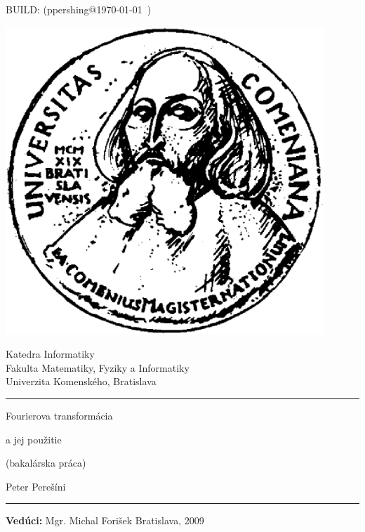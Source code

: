 \documentclass[11pt]{book}
\title{\mytitle}
\author{\myname}
\date{}
\def\mytitleone{Fourierova transformácia}
\def\mytitletwo{a jej použitie}
\def\myname{Peter Perešíni}
\def\myleader{Mgr. Michal Forišek}
\begin{document}
\frontmatter

\thispagestyle{empty}

BUILD: (ppershing@\today~\currenttime)

\begin{minipage}{0.25\textwidth}
\includegraphics[width=0.9\textwidth]{obrazky/komlogo}
\end{minipage}
\begin{minipage}{0.69\textwidth}
\begin{center}
\sc Katedra Informatiky \\
Fakulta Matematiky, Fyziky a Informatiky \\
Univerzita Komenského, Bratislava
\end{center}
\end{minipage}

\vfill
\begin{center}
\begin{minipage}{0.8\textwidth}
\hrule
\bigskip\bigskip
\centerline{\LARGE\sc \mytitleone}
\bigskip
\centerline{\LARGE\sc \mytitletwo}
\smallskip
\centerline{(bakalárska práca)}
\bigskip
\bigskip
\centerline{\large\sc \myname}
\bigskip\bigskip
\hrule
\end{minipage}
\end{center}
\vfill
{\bf Vedúci:} \myleader
\hfill Bratislava, 2009
\eject %

\pagecolor{white}
\thispagestyle{empty}~\vfill\eject %
\end{document}
